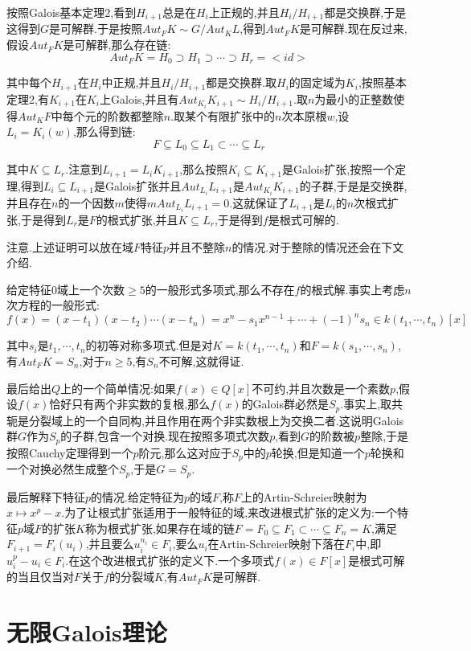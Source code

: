 按照Galois基本定理2,看到$H_{i+1}$总是在$H_i$上正规的,并且$H_i/H_ {i+1}$都是交换群,于是这得到$G$是可解群.于是按照$Aut_FK\sim G/Aut_KL$,得到$Aut_FK$是可解群.现在反过来,假设$Aut_FK$是可解群,那么存在链:
$$Aut_FK=H_0\supset H_1\supset\cdots\supset H_r=<id>$$

其中每个$H_{i+1}$在$H_i$中正规,并且$H_i/H_{i+1}$都是交换群.取$H_i$的固定域为$K_i$,按照基本定理2,有$K_{i+1}$在$K_i$上Galois,并且有$Aut_ {K_i}K_{i+1}\sim H_i/H_{i+1}$.取$n$为最小的正整数使得$Aut_KF$中每个元的阶数都整除$n$.取某个有限扩张中的$n$次本原根$w$,设$L_i=K_i(w)$,那么得到链:$$F\subseteq L_0\subseteq L_1\subset\cdots\subseteq L_r$$

其中$K\subseteq L_r$.注意到$L_{i+1}=L_iK_{i+1}$,那么按照$K_{i}\subseteq K_{i+1}$是Galois扩张,按照一个定理,得到$L_{i}\subseteq L_{i+1}$是Galois扩张并且$Aut_{L_i}L_{i+1}$是$Aut_ {K_i}K_{i+1}$的子群,于是是交换群,并且存在$n$的一个因数$m$使得$mAut_{L_i}L_{i+1}=0$.这就保证了$L_{i+1}$是$L_i$的$n$次根式扩张,于是得到$L_r$是$F$的根式扩张,并且$K\subseteq L_r$,于是得到$f$是根式可解的.

注意.上述证明可以放在域$F$特征$p$并且不整除$n$的情况.对于整除的情况还会在下文介绍.

给定特征0域上一个次数$\ge5$的一般形式多项式,那么不存在$f$的根式解.事实上考虑$n$次方程的一般形式:
$$f(x)=(x-t_1)(x-t_2)\cdots(x-t_n)=x^n-s_1x^{n-1}+\cdots+(-1)^ns_n\in
k(t_1,\cdots,t_n)[x]$$

其中$s_i$是$t_1,\cdots,t_n$的初等对称多项式.但是对$K=k(t_1,\cdots,t_n)$和$F=k(s_1,\cdots,s_n)$,有$Aut_FK=S_n$,对于$n\ge5$,有$S_n$不可解,这就得证.

最后给出$Q$上的一个简单情况:如果$f(x)\in Q[x]$不可约,并且次数是一个素数$p$,假设$f(x)$恰好只有两个非实数的复根,那么$f(x)$的Galois群必然是$S_p$.事实上,取共轭是分裂域上的一个自同构,并且作用在两个非实数根上为交换二者.这说明Galois群$G$作为$S_p$的子群,包含一个对换.现在按照多项式次数$p$,看到$G$的阶数被$p$整除,于是按照Cauchy定理得到一个$p$阶元,那么这对应于$S_p$中的$p$轮换,但是知道一个$p$轮换和一个对换必然生成整个$S_p$,于是$G=S_p$.

最后解释下特征$p$的情况.给定特征为$p$的域$F$,称$F$上的Artin-Schreier映射为$x\mapsto x^p-x$.为了让根式扩张适用于一般特征的域,来改进根式扩张的定义为:一个特征$p$域$F$的扩张$K$称为根式扩张,如果存在域的链$F=F_0\subseteq F_1\subset\cdots\subseteq F_n=K$,满足$F_ {i+1}=F_i(u_i)$,并且要么$u_i^{n_i}\in F_i$,要么$u_i$在Artin-Schreier映射下落在$F_i$中,即$u_i^p-u_i\in F_i$.在这个改进根式扩张的定义下.一个多项式$f(x)\in F[x]$是根式可解的当且仅当对$F$关于$f$的分裂域$K$,有$Aut_FK$是可解群.
\newpage
\section{无限Galois理论}

